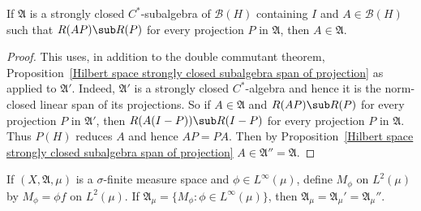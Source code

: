 \begin{corollary}
If $\mathfrak{A}$ is a strongly closed $C^*$-subalgebra of $\mathcal{B}(H)$ containing $I$ and $A\in\mathcal{B}(H)$ such that $R(AP)\sub R(P)$ for every projection $P$ in $\mathfrak{A}$, then $A\in\mathfrak{A}$.
\end{corollary}
\begin{proof}
This uses, in addition to the double commutant theorem, Proposition~\ref{Hilbert space strongly closed subalgebra span of projection} as applied to $\mathfrak{A}'$. Indeed, $\mathfrak{A}'$ is a strongly closed $C^*$-algebra and hence it is the norm-closed linear span of its projections. So if $A\in\mathfrak{A}$ and $R(AP)\sub R(P)$ for every projection $P$ in $\mathfrak{A}'$, then $R(A(I-P))\sub R(I-P)$ for every projection $P$ in $\mathfrak{A}$. Thus $P(H)$ reduces $A$ and hence $AP=PA$. Then by Proposition~\ref{Hilbert space strongly closed subalgebra span of projection} $A\in\mathfrak{A}''=\mathfrak{A}$.
\end{proof}
\begin{proposition}\label{L^2 space commutant of multiplication operator}
If $(X,\mathfrak{A},\mu)$ is a $\sigma$-finite measure space and $\phi\in L^\infty(\mu)$, define $M_\phi$ on $L^2(\mu)$ by $M_\phi=\phi f$ on $L^2(\mu)$. If $\mathfrak{A}_\mu=\{M_\phi:\phi\in L^\infty(\mu)\}$, then $\mathfrak{A}_\mu=\mathfrak{A}_\mu'=\mathfrak{A}_\mu''$. 
\end{proposition}
